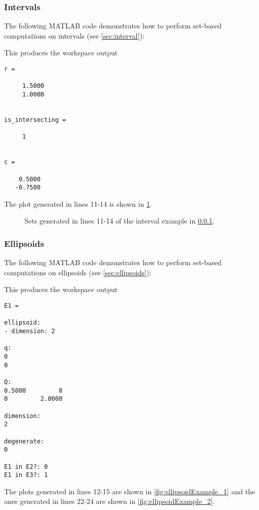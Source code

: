 
\subsubsection{Intervals}	\label{sec:intervalExample}

The following MATLAB code demonstrates how to perform set-based computations on intervals (see \cref{sec:interval}):

{\small
}

This produces the workspace output
\begin{verbatim}
r =

     1.5000
     1.0000


is_intersecting =

     1


c =

    0.5000
   -0.7500
\end{verbatim}

The plot generated in lines 11-14 is shown in \cref{fig:intervalExample}.

\begin{figure}[h!tb]
  \centering
  \caption{Sets generated in lines 11-14 of the interval example in \cref{sec:intervalExample}.}
  \label{fig:intervalExample}
\end{figure}




\subsubsection{Ellipsoids}	\label{sec:ellipsoidExample}

The following MATLAB code demonstrates how to perform set-based computations on ellipsoids (see \cref{sec:ellipsoids}):


{\small
	}

This produces the workspace output
\begin{verbatim}
E1 =

ellipsoid:
- dimension: 2

q: 
0
0

Q: 
0.5000         0
0         2.0000

dimension: 
2

degenerate: 
0

E1 in E2?: 0
E1 in E3?: 1
\end{verbatim}
The plots generated in lines 12-15 are shown in \cref{fig:ellipsoidExample_1} and the ones generated in lines 22-24 are shown in \cref{fig:ellipsoidExample_2}.

